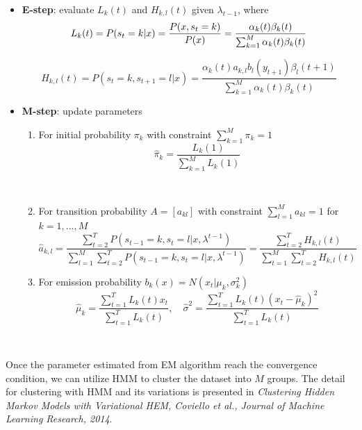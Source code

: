 \documentclass[a4paper]{article}
\begin{document}
\begin{itemize}
	\item \textbf{E-step}: evaluate $L_k(t)$ and $H_{k,l} (t)$ given $\lambda_{t-1}$, where
	\begin{equation}
		L_k(t) = P(s_t = k | x) = \frac{P(x, s_t = k )}{P(x)} =\frac{\alpha_k(t) \beta_k(t)}{\sum_{k=1}^{M} \alpha_k (t) \beta_k (t)} \\
	\end{equation}
	
	\begin{equation}
		H_{k,l} (t) = P(s_t=k, s_{t+1} = l | x) =\frac{\alpha_k (t) a_{k, l} b_l(y_{t+1}) \beta_l (t+1)}{\sum_{k=1}^{M} \alpha_k (t) \beta_k (t)}
	\end{equation}
	
	\item \textbf{M-step}: update parameters
		\begin{enumerate}
			\item For initial probability $\pi_k$ with constraint $\sum_{k=1}^{M} \pi_k = 1$
			\begin{equation}
				\hat{\pi}_k = \frac{L_k (1)}{\sum_{k=1}^{M} L_k(1)}
			\end{equation}
			
			\
			
			\item For transition probability $A = [a_{kl}]$ with constraint $\sum_{l=1}^{M} a_{kl} = 1$ for $k = 1, ..., M$
			\begin{equation}
				\hat{a}_{k,l} = \frac{\sum_{t=2}^{T} P(s_{t-1} = k, s_t = l | x, \lambda^{t-1})}{\sum_{l=1}^{M} \sum_{t=2}^{T} P(s_{t-1} = k , s_t = l | x, \lambda^{t-1})}  = \frac{\sum_{t=2}^{T} H_{k,l}(t)}{\sum_{t=1}^{M} \sum_{t=2}^{T} H_{k,l} (t)}
			\end{equation}
			
			
			\item For emission probability $b_{k}(x) = N(x_t | \mu_k, \sigma_k^2)$
			\begin{equation}
				\hat{\mu}_k = \frac{\sum_{t=1}^{T} L_k(t) x_t}{\sum_{t=1}^{T} L_k(t)}, \quad \hat{\sigma}^2 = \frac{\sum_{t=1}^{T} L_k(t) (x_t - \hat{\mu}_k)^2}{\sum_{t=1}^{T} L_k(t)}
			\end{equation}
		\end{enumerate}
\end{itemize}

\

Once the parameter estimated from EM algorithm reach the convergence condition, we can utilize HMM to cluster the dataset into $M$ groups. The detail for clustering with HMM and its variations is presented in \textit{Clustering Hidden Markov Models with Variational HEM, Coviello et al., Journal of Machine Learning Research, 2014}. 
\end{document}

